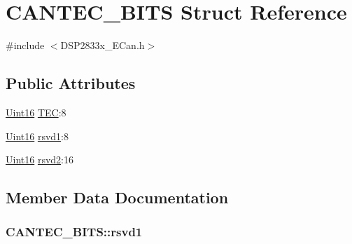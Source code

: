 \hypertarget{struct_c_a_n_t_e_c___b_i_t_s}{}\section{C\+A\+N\+T\+E\+C\+\_\+\+B\+I\+T\+S Struct Reference}
\label{struct_c_a_n_t_e_c___b_i_t_s}


{\ttfamily \#include $<$D\+S\+P2833x\+\_\+\+E\+Can.\+h$>$}

\subsection*{Public Attributes}
\begin{DoxyCompactItemize}
\item 
\hyperlink{_d_s_p2833x___device_8h_a59a9f6be4562c327cbfb4f7e8e18f08b}{Uint16} \hyperlink{struct_c_a_n_t_e_c___b_i_t_s_a761834b42aab21150ce80d4483fc5e57}{T\+E\+C}\+:8
\item 
\hyperlink{_d_s_p2833x___device_8h_a59a9f6be4562c327cbfb4f7e8e18f08b}{Uint16} \hyperlink{struct_c_a_n_t_e_c___b_i_t_s_a22ee69d424aff11f8594ece57789b17e}{rsvd1}\+:8
\item 
\hyperlink{_d_s_p2833x___device_8h_a59a9f6be4562c327cbfb4f7e8e18f08b}{Uint16} \hyperlink{struct_c_a_n_t_e_c___b_i_t_s_af204d5eb7c2cd81ce2e93a2c3814e22b}{rsvd2}\+:16
\end{DoxyCompactItemize}


\subsection{Member Data Documentation}
\hypertarget{struct_c_a_n_t_e_c___b_i_t_s_a22ee69d424aff11f8594ece57789b17e}{}
\subsubsection[{rsvd1}]{ C\+A\+N\+T\+E\+C\+\_\+\+B\+I\+T\+S\+::rsvd1}\label{struct_c_a_n_t_e_c___b_i_t_s_a22ee69d424aff11f8594ece57789b17e}
\hypertarget{struct_c_a_n_t_e_c___b_i_t_s_af204d5eb7c2cd81ce2e93a2c3814e22b}{}
